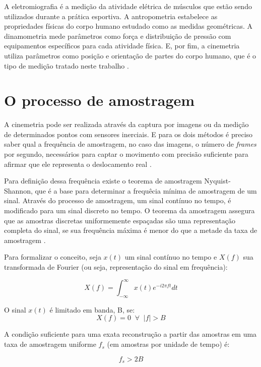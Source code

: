 A eletromiografia é a medição da atividade elétrica de músculos que estão sendo utilizados durante a prática esportiva. A antropometria estabelece as propriedades físicas do corpo humano estudado como as medidas geométricas. A dinamometria mede parâmetros como força e distribuição de pressão com equipamentos específicos para cada atividade física. E, por fim, a cinemetria utiliza parâmetros como posição e orientação de partes do corpo humano, que é o tipo de medição tratado neste trabalho \cite{amadio2007}\cite{medeiros2013}.

\section{O processo de amostragem}
 
A cinemetria pode ser realizada através da captura por imagens ou da medição de determinados pontos com sensores inerciais. E para os dois métodos é preciso saber qual a frequência de amostragem, no caso das imagens, o número de \textit{frames} por segundo, necessários para captar o movimento com precisão suficiente para afirmar que ele representa o deslocamento real \cite{amadio2007}.

Para definição dessa frequência existe o teorema de amostragem Nyquist-Shannon, que é a base para determinar a frequêcia mínima de amostragem de um sinal. Através do processo de amostragem, um sinal contínuo no tempo, é modificado para um sinal discreto no tempo. O teorema da amostragem assegura que as amostras discretas uniformemente espaçadas são uma representação completa do sinal, se sua frequência máxima é menor do que a metade da taxa de amostragem \cite{madeiro2011}.  

Para formalizar o conceito, seja $ x(t) $ um sinal contínuo no tempo e $ X(f) $ sua transformada de Fourier (ou seja, representação do sinal em frequência):

\begin{equation}
 X(f) = \int^{\infty}_{-\infty} x(t)e^{-i2\pi ft}dt 
\end{equation}

O sinal $x(t)$ é limitado em banda, B, se:
\begin{equation}
X(f) = 0 \; \;\forall \; \; |f|>B
\end{equation}

A condição suficiente para uma exata reconstrução a partir das amostras em uma taxa de amostragem uniforme $ f_{s} $ (em amostras por unidade de tempo) é:

\begin{equation}
f_{s}>2B 
\end{equation}


